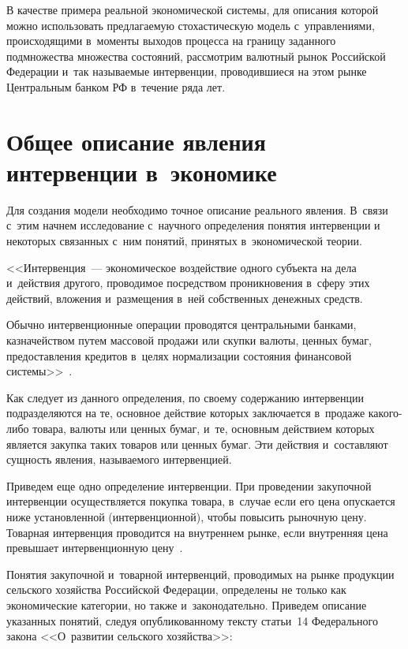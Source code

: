 \begin{multicols}{2}
В качестве примера реальной экономической системы, для описания которой можно 
использовать предлагаемую стохастическую модель с~управ\-ле\-ни\-ями, происходящими 
в~моменты выходов процесса на границу заданного подмножества \mbox{множества} состояний, 
рассмотрим валютный рынок Российской Федерации и~так называемые интервенции, 
проводившиеся на этом рынке Цент\-раль\-ным банком РФ в~течение ряда лет.

\vspace*{-6pt}

\section{Общее описание явления интервенции в~экономике}

\vspace*{-3pt}

Для создания модели необходимо точное описание реального явления. В~связи с~этим начнем исследование с~научного определения понятия интервенции
и некоторых связанных с~ним понятий, принятых в~экономической теории.

<<Интервенция~--- экономическое воздействие одного субъекта на
дела и~действия другого, проводимое посредством проникновения в~сферу
этих действий, вложения и~размещения в~ней собственных денежных средств.


Обычно интервенционные операции проводятся центральными
банками, казначейством путем массовой продажи или скупки валюты, ценных
бумаг, предоставления кредитов в~целях нормализации состояния финансовой
системы>>~\cite{SN2}.

Как следует из данного определения, по своему содержанию интервенции
подразделяются на те, основное действие которых заключается в~продаже
какого-либо товара, валюты или ценных бумаг, и~те, основным действием
которых является закупка таких товаров или ценных бумаг. Эти действия и~составляют сущность явления, называемого интервенцией.

Приведем еще одно определение интервенции.
При проведении закупочной интервенции осуществляется покупка товара, в~случае 
если его цена опускается ниже установленной (интервенционной), чтобы повысить 
рыночную цену.
Товарная интервенция проводится на внутреннем рынке, если внутренняя цена 
превышает интервенционную цену~\cite{SN2.5}.

Понятия закупочной и~товарной интервенций, проводимых на рынке продукции
сельского хозяйства Российской Федерации, определены не только как экономические 
категории, но также и~законодательно. Приведем описание указанных понятий, 
следуя
опубликованному тексту статьи~14 Федерального закона
<<О~развитии сельского хозяйства>>:


\end{multicols}

